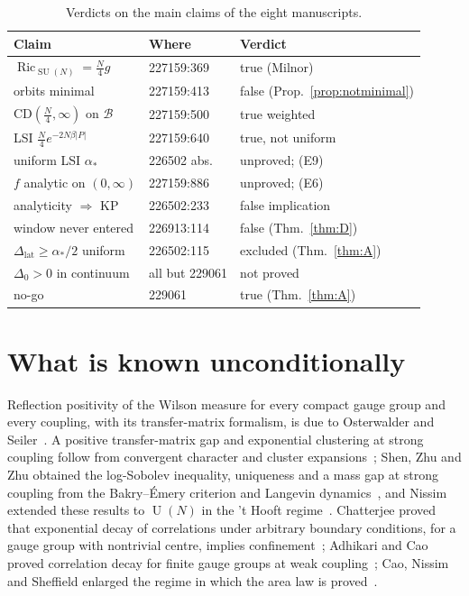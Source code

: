 \documentclass[aps,prd,twocolumn,superscriptaddress,nofootinbib,floatfix]{revtex4-2}
\theoremstyle{definition}
\theoremstyle{remark}
\DeclareMathOperator{\SU}{SU}
\DeclareMathOperator{\U}{U}
\DeclareMathOperator{\Ric}{Ric}
\newcommand{\cB}{\mathcal{B}}
\newcommand{\Dlat}{\Delta_{\mathrm{lat}}}
\begin{document}
\begin{table}[t]
\caption{Verdicts on the main claims of the eight manuscripts.}
\label{tab:audit}
\begin{ruledtabular}
\begin{tabular}{lll}
Claim & Where & Verdict\\
\hline
$\Ric_{\SU(N)}=\tfrac N4g$ & 227159:369 & true (Milnor)\\
orbits minimal & 227159:413 & false (Prop.~\ref{prop:notminimal})\\
$\mathrm{CD}(\tfrac N4,\infty)$ on $\cB$ & 227159:500 & true weighted~\cite{GKMS18}\\
LSI $\tfrac N4e^{-2N\beta|P|}$ & 227159:640 & true, not uniform\\
uniform LSI $\alpha_*$ & 226502 abs. & unproved; (E9)\\
$f$ analytic on $(0,\infty)$ & 227159:886 & unproved; (E6)\\
analyticity $\Rightarrow$ KP & 226502:233 & false implication\\
window never entered & 226913:114 & false (Thm.~\ref{thm:D})\\
$\Dlat\ge\alpha_*/2$ uniform & 226502:115 & excluded (Thm.~\ref{thm:A})\\
$\Delta_0>0$ in continuum & all but 229061 & not proved\\
no-go & 229061 & true (Thm.~\ref{thm:A})\\
\end{tabular}
\end{ruledtabular}
\end{table}

\section{What is known unconditionally}
\label{sec:known}

Reflection positivity of the Wilson measure for every compact gauge group
and every coupling, with its transfer-matrix formalism, is due to
Osterwalder and Seiler~\cite{OSei78,Sei82}. A positive transfer-matrix gap
and exponential clustering at strong coupling follow from convergent
character and cluster expansions~\cite{OSei78,Sei82,KP86}; Shen, Zhu and
Zhu obtained the log-Sobolev inequality, uniqueness and a mass gap at
strong coupling from the Bakry--\'Emery criterion and Langevin
dynamics~\cite{SZZ23}, and Nissim extended these results to $\U(N)$ in the
't Hooft regime~\cite{Nis25}. Chatterjee proved that exponential decay of
correlations under arbitrary boundary conditions, for a gauge group with
nontrivial centre, implies confinement~\cite{Cha21}; Adhikari and Cao proved
correlation decay for finite gauge groups at weak coupling~\cite{AC25}; Cao,
Nissim and Sheffield enlarged the regime in which the area law is
proved~\cite{CNS25}.
\end{document}
